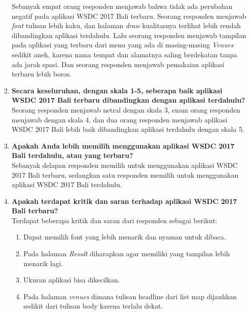 \begin{enumerate}
	Sebanyak empat orang responden menjawab bahwa tidak ada perubahan negatif pada aplikasi WSDC 2017 Bali terbaru. Seorang responden menjawab \textit{font} tulisan lebih kaku, dan halaman \textit{draw} kualitasnya terlihat lebih rendah dibandingkan aplikasi terdahulu. Lalu seorang responden menjawab tampilan pada aplikasi yang terbaru dari menu yang ada di masing-masing \textit{Venues} sedikit aneh, karena nama tempat dan alamatnya saling berdekatan tanpa ada jarak spasi. Dan seorang responden menjawab pemakaian aplikasi terbaru lebih boros.
	\item \textbf{Secara keseluruhan, dengan skala 1-5, seberapa baik aplikasi WSDC 2017 Bali terbaru dibandingkan dengan aplikasi terdahulu?} \\
	Seorang responden menjawab netral dengan skala 3, enam orang responden menjawab dengan skala 4, dan dua orang responden menjawab aplikasi WSDC 2017 Bali lebih baik dibandingkan aplikasi terdahulu dengan skala 5.
	\item \textbf{Apakah Anda lebih memilih menggunakan aplikasi WSDC 2017 Bali terdahulu, atau yang terbaru?} \\
	Sebanyak delapan responden memilih untuk menggunakan aplikasi WSDC 2017 Bali terbaru, sedangkan satu responden memilih untuk menggunakan aplikasi WSDC 2017 Bali terdahulu.
	\item \textbf{Apakah terdapat kritik dan saran terhadap aplikasi WSDC 2017 Bali terbaru?} \\
	Terdapat beberapa kritik dan saran dari responden sebagai berikut:
	\begin{enumerate}
		\item Dapat memilih font yang lebih menarik dan nyaman untuk dibaca.
		\item Pada halaman \textit{Result} diharapkan agar memiliki yang tampilan lebih menarik lagi.
		\item Ukuran aplikasi bisa dikecilkan.
		\item Pada halaman \textit{venues} dimana tulisan headline dari list map dijauhkan sedikit dari tulisan body karena terlalu dekat.
	\end{enumerate}

\end{enumerate}
